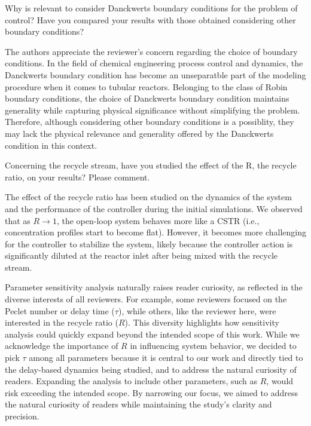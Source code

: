 \documentclass[12pt,answers]{exam}
\begin{document}
\begin{questions}

    \question Why is relevant to consider Danckwerts boundary conditions for the problem of control? Have you compared your results with those obtained considering other boundary conditions?

    \begin{solutionorbox} \label{comment:2_1}
        The authors appreciate the reviewer's concern regarding the choice of boundary conditions. In the field of chemical engineering process control and dynamics, the Danckwerts boundary condition has become an unseparatble part of the modeling procedure when it comes to tubular reactors. Belonging to the class of Robin boundary conditions, the choice of Danckwerts boundary condition maintains generality while capturing physical significance without simplifying the problem. Therefore, although considering other boundary conditions is a possiblity, they may lack the physical relevance and generality offered by the Danckwerts condition in this context.
    \end{solutionorbox}


    \question Concerning the recycle stream, have you studied the effect of the R, the recycle ratio, on your results? Please comment.

    \begin{solutionorbox} \label{comment:2_2}
        The effect of the recycle ratio has been studied on the dynamics of the system and the performance of the controller during the initial simulations. We observed that as \( R \to 1 \), the open-loop system behaves more like a CSTR (i.e., concentration profiles start to become flat). However, it becomes more challenging for the controller to stabilize the system, likely because the controller action is significantly diluted at the reactor inlet after being mixed with the recycle stream.

        Parameter sensitivity analysis naturally raises reader curiosity, as reflected in the diverse interests of all reviewers. For example, some reviewers focused on the Peclet number or delay time (\( \tau \)), while others, like the reviewer here, were interested in the recycle ratio (\( R \)). This diversity highlights how sensitivity analysis could quickly expand beyond the intended scope of this work. While we acknowledge the importance of \( R \) in influencing system behavior, we decided to pick \( \tau \) among all parameters because it is central to our work and directly tied to the delay-based dynamics being studied, and to address the natural curiosity of readers. Expanding the analysis to include other parameters, such as \( R \), would risk exceeding the intended scope. By narrowing our focus, we aimed to address the natural curiosity of readers while maintaining the study's clarity and precision. 
        

\end{solutionorbox}
\end{questions}
\end{document}
